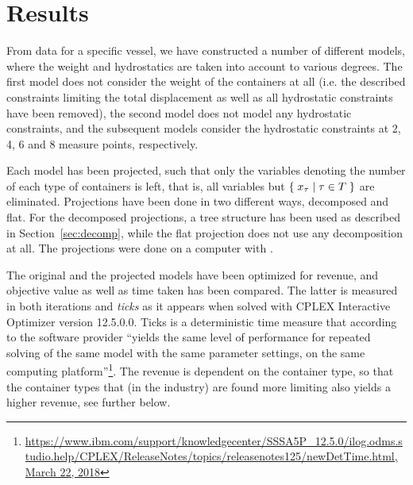 %
%

\section{Results}
From data for a specific vessel, we have constructed a number of different models, where the weight and hydrostatics are taken into account to various degrees. The first model does not consider the weight of the containers at all (i.e. the described constraints limiting the total displacement as well as all hydrostatic constraints have been removed), the second model does not model any hydrostatic constraints, and the subsequent models consider the hydrostatic constraints at 2, 4, 6 and 8 measure points, respectively.

Each model has been projected, such that only the variables denoting the number of each type of containers is left, that is, all variables but $\{\;{x_\tau}\;|\;{\tau\in T}\;\}$ are eliminated. 
Projections have been done in two different ways, decomposed and flat. For the decomposed projections, a tree structure has been used as described in Section~\ref{sec:decomp}, while the flat projection does not use any decomposition at all. %
The projections were done on a  computer with  .

The original and the projected models have been optimized for revenue, and objective value as well as time taken has been compared. The latter is measured in both iterations and \emph{ticks} as it appears when solved with CPLEX Interactive Optimizer version 12.5.0.0. Ticks is a deterministic time measure that according to the software provider ``yields the same level of performance for repeated solving of the same model with the same parameter settings, on the same computing platform''\footnote{\url{https://www.ibm.com/support/knowledgecenter/SSSA5P_12.5.0/ilog.odms.studio.help/CPLEX/ReleaseNotes/topics/releasenotes125/newDetTime.html, March 22, 2018}}. 
The revenue is dependent on the container type, so that the container types that (in the industry) are found more limiting also yields a higher revenue, see further below. 

